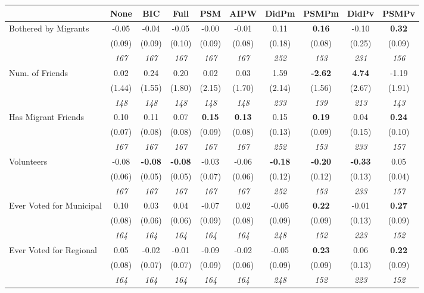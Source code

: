 \begin{tabular}{l c c c c c c c c c}
\toprule
 & None & BIC & Full & PSM & AIPW & DidPm & PSMPm & DidPv & PSMPv \\
\midrule
Bothered by Migrants & -0.05 & -0.04 & -0.05 & -0.00 & -0.01 & 0.11 & \textbf{0.16} & -0.10 & \textbf{0.32} \\
& (0.09) & (0.09) & (0.10) & (0.09) & (0.08) & (0.18) & (0.08) & (0.25) & (0.09) \\
& \textit{ 167 } & \textit{ 167 } & \textit{ 167 } & \textit{ 167 } & \textit{ 167 } & \textit{ 252 } & \textit{ 153 } & \textit{ 231 } & \textit{ 156 } \\
Num. of Friends & 0.02 & 0.24 & 0.20 & 0.02 & 0.03 & 1.59 & \textbf{-2.62} & \textbf{ 4.74 } & -1.19 \\
& (1.44) & (1.55) & (1.80) & (2.15) & (1.70) & (2.14) & (1.56) & (2.67) & (1.91) \\
& \textit{ 148 } & \textit{ 148 } & \textit{ 148 } & \textit{ 148 } & \textit{ 148 } & \textit{ 233 } & \textit{ 139 } & \textit{ 213 } & \textit{ 143 } \\
Has Migrant Friends & 0.10 & 0.11 & 0.07 & \textbf{0.15} & \textbf{0.13} & 0.15 & \textbf{0.19} & 0.04 & \textbf{0.24} \\
& (0.07) & (0.08) & (0.08) & (0.09) & (0.08) & (0.13) & (0.09) & (0.15) & (0.10) \\
& \textit{ 167 } & \textit{ 167 } & \textit{ 167 } & \textit{ 167 } & \textit{ 167 } & \textit{ 252 } & \textit{ 153 } & \textit{ 233 } & \textit{ 157 } \\
Volunteers & -0.08 & \textbf{ -0.08 } & \textbf{ -0.08 } & -0.03 & -0.06 & \textbf{ -0.18 } & \textbf{-0.20} & \textbf{ -0.33 } & 0.05 \\
& (0.06) & (0.05) & (0.05) & (0.07) & (0.06) & (0.12) & (0.12) & (0.13) & (0.04) \\
& \textit{ 167 } & \textit{ 167 } & \textit{ 167 } & \textit{ 167 } & \textit{ 167 } & \textit{ 252 } & \textit{ 153 } & \textit{ 233 } & \textit{ 157 } \\
Ever Voted for Municipal & 0.10 & 0.03 & 0.04 & -0.07 & 0.02 & -0.05 & \textbf{0.22} & -0.01 & \textbf{0.27} \\
& (0.08) & (0.06) & (0.06) & (0.09) & (0.08) & (0.09) & (0.09) & (0.13) & (0.09) \\
& \textit{ 164 } & \textit{ 164 } & \textit{ 164 } & \textit{ 164 } & \textit{ 164 } & \textit{ 248 } & \textit{ 152 } & \textit{ 223 } & \textit{ 152 } \\
Ever Voted for Regional & 0.05 & -0.02 & -0.01 & -0.09 & -0.02 & -0.05 & \textbf{0.23} & 0.06 & \textbf{0.22} \\
& (0.08) & (0.07) & (0.07) & (0.09) & (0.06) & (0.09) & (0.09) & (0.13) & (0.09) \\
& \textit{ 164 } & \textit{ 164 } & \textit{ 164 } & \textit{ 164 } & \textit{ 164 } & \textit{ 248 } & \textit{ 152 } & \textit{ 223 } & \textit{ 152 } \\
\bottomrule
\end{tabular}
